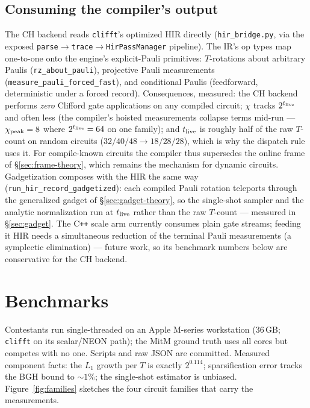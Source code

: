 \documentclass[11pt]{article}
\begin{document}
\subsection{Consuming the compiler's output}\label{sec:hir}
The CH backend reads \texttt{clifft}'s optimized HIR directly
(\texttt{hir\_bridge.py}, via the exposed
\texttt{parse}$\to$\texttt{trace}$\to$\texttt{HirPassManager} pipeline). The
IR's op types map one-to-one onto the engine's explicit-Pauli primitives:
$T$-rotations about arbitrary Paulis (\texttt{rz\_about\_pauli}), projective
Pauli measurements (\texttt{measure\_pauli\_forced\_fast}), and conditional
Paulis (feedforward, deterministic under a forced record). Consequences,
measured: the CH backend performs \emph{zero} Clifford gate applications on any
compiled circuit; $\chi$ tracks $2^{t_{\rm live}}$ and often less (the
compiler's hoisted measurements collapse terms mid-run --- $\chi_{\rm peak}=8$
where $2^{t_{\rm live}}=64$ on one family); and $t_{\rm live}$ is roughly
half of the raw $T$-count on random circuits ($32/40/48 \to 18/28/28$), which
is why the dispatch rule uses it. For compile-known circuits the compiler
thus supersedes the online frame of \S\ref{sec:frame-theory}, which remains
the mechanism for dynamic circuits. Gadgetization composes with the HIR the
same way (\texttt{run\_hir\_record\_gadgetized}): each compiled Pauli
rotation teleports through the generalized gadget of
\S\ref{sec:gadget-theory}, so the single-shot sampler and the analytic
normalization run at $t_{\rm live}$ rather than the raw $T$-count ---
measured in \S\ref{sec:gadget}. The C\texttt{++} scale arm currently
consumes plain gate streams; feeding it HIR needs a simultaneous reduction of
the terminal Pauli measurements (a symplectic elimination) --- future work,
so its benchmark numbers below are conservative for the CH backend.

\section{Benchmarks}\label{sec:bench}
Contestants run single-threaded on an Apple M-series workstation ($36$\,GB;
\texttt{clifft} on its scalar/NEON path); the MitM ground truth uses all
cores but competes with no one. Scripts and raw JSON are committed. Measured
component facts: the $L_1$ growth per $T$ is exactly $2^{0.114}$;
sparsification error tracks the BGH bound to $\sim\!1\%$; the single-shot
estimator is unbiased. Figure~\ref{fig:families} sketches the four circuit
families that carry the measurements.
\end{document}
